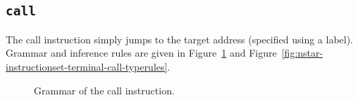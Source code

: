 \subsection{\texttt{call}}\label{subsec:nstar-instructionset-terminal-call}

The {\Iformat call} instruction simply jumps to the target address (specified using a label).
Grammar and inference rules are given in Figure~\ref{fig:nstar-instructionset-terminal-call-grammar} and Figure~\ref{fig:nstar-instructionset-terminal-call-typerules}.

\begin{figure}[H]
	\centering


	\caption{Grammar of the {\Iformat call} instruction.}
	\label{fig:nstar-instructionset-terminal-call-grammar}
\end{figure}

